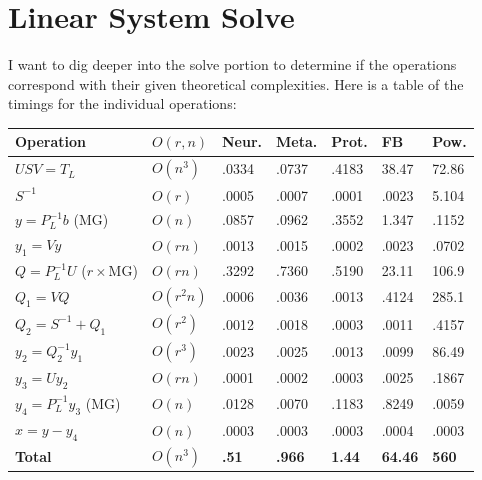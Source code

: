 \documentclass{article}
\begin{document}
\section{Linear System Solve}
I want to dig deeper into the solve portion to determine if the operations correspond with their given theoretical complexities. Here is a table of the timings for the individual operations:\\
\begin{spacing}{1}
\begin{center}
\renewcommand{\arraystretch}{1.5}
    \begin{tabular}{ | l | l | l | l | l | l | l |}
    \hline
    \textbf{Operation} & \textbf{$O(r,n)$} & \textbf{Neur.} & \textbf{Meta.} & \textbf{Prot.} & \textbf{FB} & \textbf{Pow.} \\ \hline
    $USV = T_L$ & $O(n^3)$ & .0334 & .0737 & .4183 & 38.47 & 72.86  \\ \hline
    $S^{-1}$ & $O(r)$ & .0005 & .0007 & .0001 & .0023 & 5.104 \\ \hline
    $y = P_L^{-1}b$ (MG) & $O(n)$ & .0857 & .0962 & .3552 & 1.347 & .1152  \\  \hline
    $y_1 = Vy$ & $O(rn)$ & .0013 & .0015 & .0002 & .0023 & .0702 \\ \hline
    $Q = P_L^{-1}U$ ($r\times$MG) & $O(rn)$ & .3292 & .7360 & .5190 & 23.11 & 106.9  \\ \hline
    $Q_1 = VQ$ & $O(r^2 n)$ & .0006 & .0036 & .0013 & .4124 & 285.1 \\ \hline
    $Q_2 = S^{-1} + Q_1$ & $O(r^2)$ & .0012 & .0018 & .0003 & .0011 & .4157 \\ \hline
    $y_2 = Q_2^{-1}y_1$ & $O(r^3)$ & .0023 & .0025 & .0013 & .0099 & 86.49 \\ \hline
    $y_3 = Uy_2$ & $O(rn)$ & .0001 & .0002 & .0003 & .0025 & .1867 \\ \hline
    $y_4 = P_L^{-1}y_3$ (MG) & $O(n)$ &.0128 & .0070 & .1183 & .8249 & .0059 \\ \hline
    $x = y - y_4$ & $O(n)$ &.0003 & .0003 & .0003 & .0004 & .0003 \\ \hline
    \textbf{Total} & \textbf{$O(n^3)$} & \textbf{.51} & \textbf{.966} & \textbf{1.44} & \textbf{64.46} & \textbf{560} \\
    \hline
    \end{tabular}
\end{center}
\end{spacing}
\end{document}
